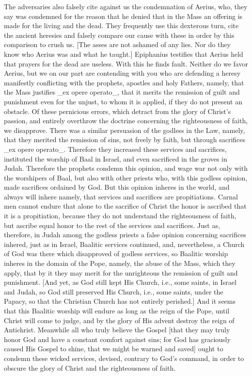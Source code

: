 The adversaries also falsely cite against us the condemnation of
Aerius, who, they say was condemned for the reason that he denied
that in the Mass an offering is made for the living and the dead.
They frequently use this dexterous turn, cite the ancient heresies
and falsely compare our cause with these in order by this comparison
to crush us.  [The asses are not ashamed of any lies.  Nor do they
know who Aerius was and what he taught.] Epiphanius testifies that
Aerius held that prayers for the dead are useless.  With this he
finds fault.  Neither do we favor Aerius, but we on our part are
contending with you who are defending a heresy manifestly conflicting
with the prophets, apostles and holy Fathers, namely, that the Mass
justifies _ex opere operato_, that it merits the remission of guilt
and punishment even for the unjust, to whom it is applied, if they do
not present an obstacle.  Of these pernicious errors, which detract
from the glory of Christ's passion, and entirely overthrow the
doctrine concerning the righteousness of faith, we disapprove.  There
was a similar persuasion of the godless in the Law, namely, that they
merited the remission of sins, not freely by faith, but through
sacrifices _ex opere operato_.  Therefore they increased these
services and sacrifices, instituted the worship of Baal in Israel,
and even sacrificed in the groves in Judah.  Therefore the prophets
condemn this opinion, and wage war not only with the worshipers of
Baal, but also with other priests who, with this godless opinion,
made sacrifices ordained by God.  But this opinion inheres in the
world, and always will inhere namely, that services and sacrifices
are propitiations.  Carnal men cannot endure that alone to the
sacrifice of Christ the honor is ascribed that it is a propitiation,
because they do not understand the righteousness of faith, but
ascribe equal honor to the rest of the services and sacrifices.  Just
as, therefore, in Judah among the godless priests a false opinion
concerning sacrifices inhered, just as in Israel, Baalitic services
continued, and, nevertheless, a Church of God was there which
disapproved of godless services, so Baalitic worship inheres in the
domain of the Pope, namely, the abuse of the Mass, which they apply,
that by it they may merit for the unrighteous the remission of guilt
and punishment.  [And yet, as God still kept His Church, i.e., some
saints, in Israel and Judah, so God still preserved His Church, i.e.,
some saints, under the Papacy, so that the Christian Church has not
entirely perished.] And it seems that this Baalitic worship will
endure as long as the reign of the Pope, until Christ will come to
judge, and by the glory of His advent destroy the reign of Antichrist.
Meanwhile all who truly believe the Gospel [that they may truly
honor God and have a constant comfort against sins; for God has
graciously caused His Gospel to shine, that we might be warned and
saved] ought to condemn these wicked services, devised, contrary to
God's command, in order to obscure the glory of Christ and the
righteousness of faith.

